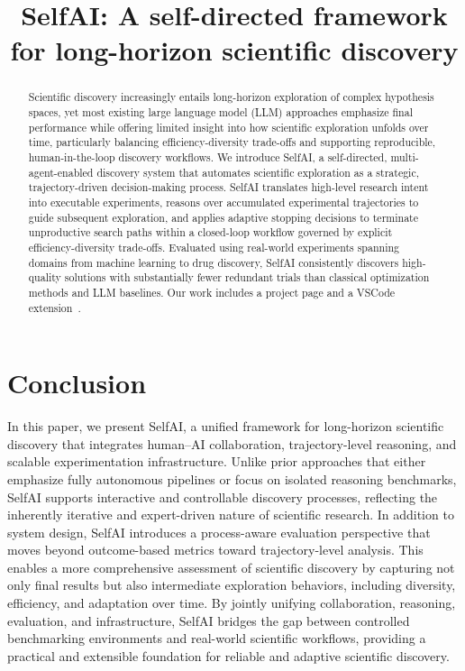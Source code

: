 \documentclass{article}
\title{SelfAI: A self-directed framework for long-horizon scientific discovery}
\begin{document}
\maketitle

\begin{abstract}
    Scientific discovery increasingly entails long-horizon exploration of complex hypothesis spaces, yet most existing large language model (LLM) approaches emphasize final performance while offering limited insight into how scientific exploration unfolds over time, particularly balancing efficiency-diversity trade-offs and supporting reproducible, human-in-the-loop discovery workflows. We introduce SelfAI, a self-directed, multi-agent-enabled discovery system that automates scientific exploration as a strategic, trajectory-driven decision-making process. SelfAI translates high-level research intent into executable experiments, reasons over accumulated experimental trajectories to guide subsequent exploration, and applies adaptive stopping decisions to terminate unproductive search paths within a closed-loop workflow governed by explicit efficiency-diversity trade-offs. Evaluated using real-world experiments spanning domains from machine learning to drug discovery, SelfAI consistently discovers high-quality solutions with substantially fewer redundant trials than classical optimization methods and LLM baselines. Our work includes a project page and a VSCode extension~\url{}.
\end{abstract}






\section{Conclusion}
In this paper, we present SelfAI, a unified framework for long-horizon scientific discovery that integrates human--AI collaboration, trajectory-level reasoning, and scalable experimentation infrastructure. Unlike prior approaches that either emphasize fully autonomous pipelines or focus on isolated reasoning benchmarks, SelfAI supports interactive and controllable discovery processes, reflecting the inherently iterative and expert-driven nature of scientific research.
In addition to system design, SelfAI introduces a process-aware evaluation perspective that moves beyond outcome-based metrics toward trajectory-level analysis. This enables a more comprehensive assessment of scientific discovery by capturing not only final results but also intermediate exploration behaviors, including diversity, efficiency, and adaptation over time. By jointly unifying collaboration, reasoning, evaluation, and infrastructure, SelfAI bridges the gap between controlled benchmarking environments and real-world scientific workflows, providing a practical and extensible foundation for reliable and adaptive scientific discovery.








\appendix




\newpage

\end{document}
